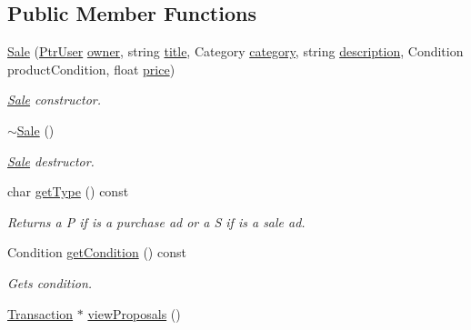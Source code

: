 \subsection*{Public Member Functions}
\begin{DoxyCompactItemize}
\item 
\hyperlink{class_sale_a88035d832c80d9fcbde010f3b7143e50}{Sale} (\hyperlink{class_ptr_user}{Ptr\+User} \hyperlink{class_advertisement_abcb6446847bfd1880be9c854c4442313}{owner}, string \hyperlink{class_advertisement_a63b197da6f91139ed6baf700f834a3db}{title}, Category \hyperlink{class_advertisement_af77599e289974c0e4f502db621257fe5}{category}, string \hyperlink{class_advertisement_afb0909f9fceabb44804e06e721ff7fee}{description}, Condition product\+Condition, float \hyperlink{class_advertisement_aefd1dddaabd0cfa411e6cbaaf67c4dd5}{price})
\begin{DoxyCompactList}\small\item\em \hyperlink{class_sale}{Sale} constructor. \end{DoxyCompactList}\item 
\hypertarget{class_sale_ab6cb58a5d618fc4e4988b55342f21b21}{}\hyperlink{class_sale_ab6cb58a5d618fc4e4988b55342f21b21}{$\sim$\+Sale} ()\label{class_sale_ab6cb58a5d618fc4e4988b55342f21b21}

\begin{DoxyCompactList}\small\item\em \hyperlink{class_sale}{Sale} destructor. \end{DoxyCompactList}\item 
char \hyperlink{class_sale_ae105e16c4b41870d375c5b1442dc7031}{get\+Type} () const 
\begin{DoxyCompactList}\small\item\em Returns a P if is a purchase ad or a S if is a sale ad. \end{DoxyCompactList}\item 
Condition \hyperlink{class_sale_a5c65f4917d237370ab578307a124342f}{get\+Condition} () const 
\begin{DoxyCompactList}\small\item\em Gets condition. \end{DoxyCompactList}\item 
\hypertarget{class_sale_a405adc35a23da46600451385bad6fd81}{}\hyperlink{class_transaction}{Transaction} $\ast$ \hyperlink{class_sale_a405adc35a23da46600451385bad6fd81}{view\+Proposals} ()\label{class_sale_a405adc35a23da46600451385bad6fd81}


\end{DoxyCompactItemize}
